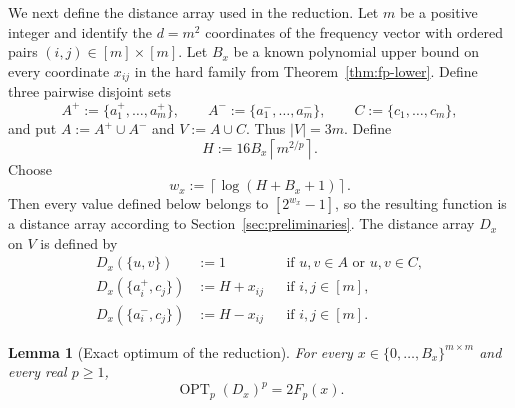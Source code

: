 \documentclass[11pt]{article}
\newtheorem{lemma}[theorem]{Lemma}
\theoremstyle{definition}
\newcommand{\OPT}{\operatorname{OPT}}
\newcommand{\Fp}{F_p}
\begin{document}
We next define the distance array used in the reduction.  Let \(m\) be a
positive integer and identify the \(d=m^2\) coordinates of the frequency
vector with ordered pairs \((i,j)\in[m]\times[m]\).  Let \(B_x\) be a known
polynomial upper bound on every coordinate \(x_{ij}\) in the hard family from
Theorem~\ref{thm:fp-lower}.  Define three pairwise disjoint sets
\[
 A^+:=\{a_1^+,\ldots,a_m^+\},
 \qquad
 A^-:=\{a_1^-,\ldots,a_m^-\},
 \qquad
 C:=\{c_1,\ldots,c_m\},
\]
and put \(A:=A^+\cup A^-\) and \(V:=A\cup C\).  Thus \(|V|=3m\).  Define
\[
 H:=16B_x\left\lceil m^{2/p}\right\rceil.
\]
Choose
\[
 w_x:=\left\lceil\log(H+B_x+1)\right\rceil.
\]
Then every value defined below belongs to \([2^{w_x}-1]\), so the resulting
function is a distance array according to
Section~\ref{sec:preliminaries}.
The distance array \(D_x\) on \(V\) is defined by
\begin{align*}
 D_x(\{u,v\})&:=1
 &&\text{if \(u,v\in A\) or \(u,v\in C\)},\\
 D_x(\{a_i^+,c_j\})&:=H+x_{ij}
 &&\text{if \(i,j\in[m]\)},\\
 D_x(\{a_i^-,c_j\})&:=H-x_{ij}
 &&\text{if \(i,j\in[m]\)}.
\end{align*}

\begin{lemma}[Exact optimum of the reduction]\label{lem:exact-reduction}
For every \(x\in\{0,\ldots,B_x\}^{m\times m}\) and every real \(p\ge1\),
\[
 \OPT_p(D_x)^p=2\Fp(x).
\]
\end{lemma}
\end{document}
